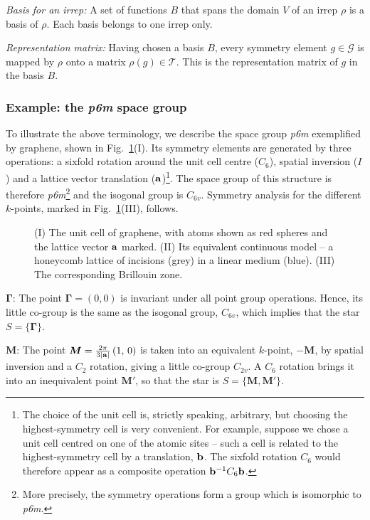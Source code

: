 \textit{Basis for an irrep:} A set of functions $B$ that spans the domain $V$ of an irrep $\rho$ is a basis of $\rho$. Each basis belongs to one irrep only.

\textit{Representation matrix:} Having chosen a basis $B$, every symmetry element $g \in \mathcal{G}$ is mapped by $\rho$ onto a matrix $\rho(g) \in \mathcal{T}$. This is the representation matrix of $g$ in the basis $B$.

\subsubsection{Example: the \textit{p6m} space group}

To illustrate the above terminology, we describe the space group \textit{p6m} exemplified by graphene, shown in Fig.~\ref{fig:symm_graphene}(I). Its symmetry elements are generated by three operations: a sixfold rotation around the unit cell centre ($C_6$), spatial inversion ($I$) and a lattice vector translation ($\vb{a}$)\footnote{The choice of the unit cell is, strictly speaking, arbitrary, but choosing the highest-symmetry cell is very convenient. For example, suppose we chose a unit cell centred on one of the atomic sites -- such a cell is related to the highest-symmetry cell by a translation, $\vb{b}$. The sixfold rotation $C_6$ would therefore appear as a composite operation $\vb{b}^{-1} C_6 \vb{b}$.}. The space group of this structure is therefore \textit{p6m}\footnote{More precisely, the symmetry operations form a group which is isomorphic to \textit{p6m}.} and the isogonal group is $C_{6v}$. Symmetry analysis for the different $k$-points, marked in Fig.~\ref{fig:symm_graphene}(III), follows.

\begin{figure} [h!]
	\centering
	
	\caption{(I) The unit cell of graphene, with atoms shown as red spheres and the lattice vector $\vb{a}$ marked. (II) Its equivalent continuous model -- a honeycomb lattice of incisions (grey) in a linear medium (blue). (III) The corresponding Brillouin zone.}
	\label{fig:symm_graphene}
\end{figure} 

$\boldsymbol{\Gamma}$: The point $\boldsymbol{\Gamma} = (0,0)$ is invariant under all point group operations. Hence, its little co-group is the same as the isogonal group, $C_{6v}$, which implies that the star $S = \{ \boldsymbol{\Gamma} \}$.

$\boldsymbol{M}$: The point $\boldsymbol{M} = \frac{2\pi}{3 \abs{\vb{a}}} \left(1,\,0 \right)$ is taken into an equivalent $k$-point, $-\boldsymbol{M}$, by spatial inversion and a $C_2$ rotation, giving a little co-group $C_{2v}$. A $C_6$ rotation brings it into an inequivalent point $\boldsymbol{M}'$, so that the star is $S = \{ \boldsymbol{M}, \boldsymbol{M}' \}$. 

